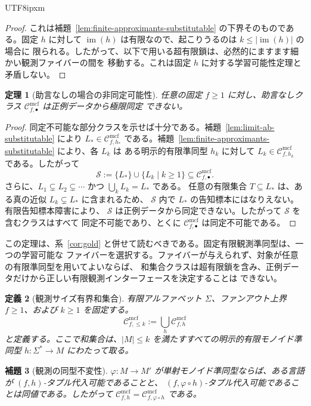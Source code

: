 \documentclass[10pt,a4paper]{article}
\newtheorem{theorem}{定理}[section]
\newtheorem{lemma}[theorem]{補題}
\newtheorem{definition}[theorem]{定義}
\theoremstyle{remark}
\newcommand{\Cmcf}[2]{\mathcal{C}^{\mathrm{mcf}}_{#1,#2}}
\begin{document}
\begin{CJK}{UTF8}{ipxm}
\begin{proof}
これは補題~\ref{lem:finite-approximants-substitutable} の下界そのものである。固定 \(h\) に対して
\(\operatorname{im}(h)\) は有限なので、起こりうるのは \(k\le|\operatorname{im}(h)|\) の場合に
限られる。したがって、以下で用いる超有限鎖は、必然的にますます細かい観測ファイバーの間を
移動する。これは固定 \(h\) に対する学習可能性定理と矛盾しない。
\end{proof}

\begin{theorem}[助言なしの場合の非同定可能性]
\label{thm:no-advice-nonidentifiability}
任意の固定 \(f\ge1\) に対し、助言なしクラス \(\Cmcf{f}{\bullet}\) は正例データから極限同定
できない。
\end{theorem}

\begin{proof}
同定不可能な部分クラスを示せば十分である。補題~\ref{lem:limit-ab-substitutable} により
\(L_*\in\Cmcf{f}{h_*}\) である。補題~\ref{lem:finite-approximants-substitutable} により、各 \(L_k\) は
ある明示的有限準同型 \(h_k\) に対して \(L_k\in\Cmcf{f}{h_k}\) である。したがって
\[
  \mathcal S:=\{L_*\}\cup\{L_k\mid k\ge1\}\subseteq\Cmcf{f}{\bullet}.
\]
さらに、\(L_1\subsetneq L_2\subsetneq\cdots\) かつ \(\bigcup_k L_k=L_*\) である。
任意の有限集合 \(T\subseteq L_*\) は、ある真の近似 \(L_k\subsetneq L_*\) に含まれるため、
\(\mathcal S\) 内で \(L_*\) の告知標本にはなりえない。有限告知標本障害により、
\(\mathcal S\) は正例データから同定できない。したがって \(\mathcal S\) を含むクラスはすべて
同定不可能であり、とくに \(\Cmcf{f}{\bullet}\) は同定不可能である。
\end{proof}

この定理は、系~\ref{cor:gold} と併せて読むべきである。固定有限観測準同型は、一つの学習可能な
ファイバーを選択する。ファイバーが与えられず、対象が任意の有限準同型を用いてよいならば、
和集合クラスは超有限鎖を含み、正例データだけから正しい有限観測インターフェースを決定することは
できない。

\begin{definition}[観測サイズ有界和集合]
\label{def:bounded-observation-union}
有限アルファベット \(\Sigma\)、ファンアウト上界 \(f\ge1\)、および \(k\ge1\) を固定する。
\[
  \Cmcf{f}{\le k}:=\bigcup_h \Cmcf{f}{h}
\]
と定義する。ここで和集合は、\(|M|\le k\) を満たすすべての明示的有限モノイド準同型
\(h:\Sigma^*\to M\) にわたって取る。
\end{definition}

\begin{lemma}[観測の同型不変性]
\label{lem:iso-invariance}
\(\varphi:M\to M'\) が単射モノイド準同型ならば、ある言語が \((f,h)\)-タプル代入可能であることと、
\((f,\varphi\circ h)\)-タプル代入可能であることは同値である。したがって
\(\Cmcf{f}{h}=\Cmcf{f}{\varphi\circ h}\) である。
\end{lemma}


\end{CJK}
\end{document}
